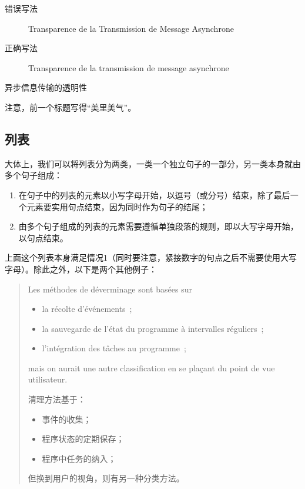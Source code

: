 \begin{description}
    \item[错误写法] Transparence de la Transmission de Message Asynchrone
    \item[正确写法] Transparence de la transmission de message asynchrone
\end{description}

\begin{bil}
    异步信息传输的透明性
\end{bil}

注意，前一个标题写得“美里美气”。

\subsection{列表}

大体上，我们可以将列表分为两类，一类一个独立句子的一部分，另一类本身就由多个句子组成：

\begin{enumerate}
    \item 在句子中的列表的元素以小写字母开始，以逗号（或分号）结束，除了最后一个元素要实用句点结束，因为同时作为句子的结尾；
    \item 由多个句子组成的列表的元素需要遵循单独段落的规则，即以大写字母开始，以句点结束。
\end{enumerate}

上面这个列表本身满足情况1（同时要注意，紧接数字的句点之后不需要使用大写字母）。除此之外，以下是两个其他例子：

\begin{quote}
    Les méthodes de déverminage sont basées sur
    \begin{itemize}
        \item la récolte d’événements~;
        \item la sauvegarde de l’état du programme à intervalles réguliers~;
        \item l’intégration des tâches au programme~;
    \end{itemize}
    mais on aurait une autre classification en se plaçant du point de vue utilisateur.
    \begin{bil}
        清理方法基于：
        \begin{itemize}
            \item 事件的收集；
            \item 程序状态的定期保存；
            \item 程序中任务的纳入；
        \end{itemize}
        但换到用户的视角，则有另一种分类方法。
    \end{bil}
    
\end{quote}

